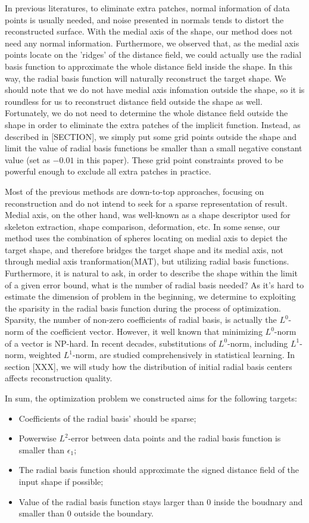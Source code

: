 \documentclass[review]{acmsiggraph}
\begin{document}
In previous literatures, to eliminate extra patches, normal information of data points is usually needed, and noise presented in normals tends to distort the reconstructed surface. With the medial axis of the shape, our method does not need any normal information. Furthermore, we observed that, as the medial axis points locate on the 'ridges' of the distance field, we could actually use the radial basis function to approximate the whole distance field inside the shape. In this way, the radial basis function will naturally reconstruct the target shape. We should note that we do not have medial axis infomation outside the shape, so it is roundless for us to reconstruct distance field outside the shape as well. Fortunately, we do not need to determine the whole distance field outside the shape in order to eliminate the extra patches of the implicit function. Instead, as described in [SECTION], we simply put some grid points outside the shape and limit the value of radial basis functions be smaller than a small negative constant value (set as $-0.01$ in this paper). These grid point constraints proved to be powerful enough to exclude all extra patches in practice.

Most of the previous methods are down-to-top approaches, focusing on reconstruction and do not intend to seek for a sparse representation of result. Medial axis, on the other hand, was well-known as a shape descriptor used for skeleton extraction, shape comparison, deformation, etc. In some sense, our method uses the combination of spheres locating on medial axis to depict the target shape, and therefore bridges the target shape and its medial axis, not through medial axis tranformation(MAT), but utilizing radial basis functions. Furthermore, it is natural to ask, in order to describe the shape within the limit of a given error bound, what is the number of radial basis needed? As it's hard to estimate the dimension of problem in the beginning, we determine to exploiting the sparisity in the radial basis function during the process of optimization. Sparsity, the number of non-zero coefficients of radial basis, is actually the $L^0$-norm of the coefficient vector. However, it well known that minimizing $L^0$-norm of a vector is NP-hard. In recent decades, substitutions of $L^0$-norm, including $L^1$-norm, weighted $L^1$-norm, are studied comprehensively in statistical learning.  In section [XXX], we will study how the distribution of initial radial basis centers affects reconstruction quality.


In sum, the optimization problem we constructed aims for the following targets:
\begin{itemize}
\item Coefficients of the radial basis' should be sparse;
\item Powerwise $L^2$-error between data points and the radial basis function is smaller than $\epsilon_1$;
\item The radial basis function should approximate the signed distance field of the input shape if possible; 
\item Value of the radial basis function stays larger than 0 inside the boudnary and smaller than 0 outside the boundary.
\end{itemize}
\end{document}
